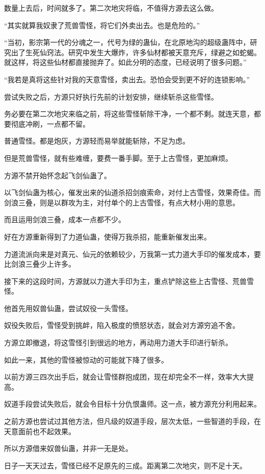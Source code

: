 \begin{this_body}
数量上去后，时间就多了。第二次地灾将临，不值得方源去这么做。

“其实就算我奴隶了荒兽雪怪，将它们外卖出去。也是危险的。”

“当初，影宗第一代的分魂之一，代号为绿的蛊仙，在北原地沟的超级蛊阵中，研究出了生死仙窍法。研究中发生大爆炸，许多仙材都被天意充斥，绿避之如蛇蝎。就这样，将这些仙材都直接抛弃了。如此分明的态度，已经说明了很多问题。”

“我若是真将这些针对我的天意雪怪，卖出去。恐怕会受到更不好的连锁影响。”

尝试失败之后，方源只好执行先前的计划安排，继续斩杀这些雪怪。

务必要在第二次地灾来临之前，将这些雪怪斩除干净，一个都不剩。就连天意，都要彻底冲刷，一点都不留。

普通雪怪。都是炮灰，方源轻而易举就能斩除，不足为虑。

但是荒兽雪怪，就有些难缠，要费一番手脚。至于上古雪怪，更加麻烦。

方源不禁开始怀念起飞剑仙蛊了。

以飞剑仙蛊为核心，催发出来的仙道杀招剑痕索命，对付上古雪怪，效果奇佳。而剑浪三叠，则是以群攻为主，对付单个的上古雪怪，有点大材小用的意思。

而且运用剑浪三叠，成本一点都不少。

好在方源重新得到了力道仙蛊，使得万我杀招，能重新催发出来。

力道流派向来是对真元、仙元的依赖较少，万我第一式力道大手印的催发成本，要比剑浪三叠少上许多。

接下来的这段时间，方源就以力道大手印为主，重点铲除这些上古雪怪、荒兽雪怪。

他首先用奴兽仙蛊，尝试奴役一头雪怪。

奴役失败后，雪怪受到挑衅，陷入极度的愤怒状态，就会对方源穷追不舍。

方源立即撤退，将这雪怪引到很远的地方，再动用力道大手印进行斩杀。

如此一来，其他的雪怪被惊动的可能就下降了很多。

以前方源三四次出手后，就会让雪怪群抱成团，现在却完全不一样，效率大大提高。

奴道手段尝试失败后，就会令目标十分仇恨蛊师。这一点，被方源充分利用起来。

之前方源也尝试过其他方法，但凡级的奴道手段，层次太低，一些智道的手段，在天意面前也不起效果。

所以方源借来奴兽仙蛊，并非一无是处。

日子一天天过去，雪怪已经不足原先的三成。距离第二次地灾，则不足十天。


\end{this_body}
